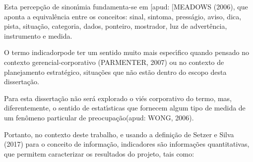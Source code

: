 \documentclass[
12pt,		%
openright,	%
twoside,  %
a4paper,			%
chapter=TITLE,		%
english,			%
french,				%
spanish,			%
brazil				%
]{USPSC-classe/USPSC}
\begin{document}
Esta percep\c{c}\~ao de sinon\'{\i}mia fundamenta-se em [apud: [MEADOWS (2006), que aponta a equival\^encia entre os conceitos: sinal, sintoma, press\'agio, aviso, dica, pista, situa\c{c}\~ao, categoria, dados, ponteiro, mostrador, luz de advert\^encia, instrumento e medida.

















O termo \textquotedbl indicador\textquotedbl  pode ter um sentido muito mais espec\'{\i}fico quando pensado no contexto gerencial-corporativo (PARMENTER, 2007) ou no contexto de planejamento estrat\'egico, situa\c{c}\~oes que n\~ao est\~ao dentro do escopo desta disserta\c{c}\~ao.

















Para esta disserta\c{c}\~ao n\~ao ser\'a explorado o vi\'es corporativo do termo, mas, diferentemente, o sentido de \textquotedbl estat\'{\i}sticas que fornecem algum tipo de medida de um fen\^omeno particular de preocupa\c{c}\~ao\textquotedbl  (apud: WONG, 2006).

















Portanto, no contexto deste trabalho, e usando a defini\c{c}\~ao de  Setzer e Silva (2017) para o conceito de \textquotedbl informa\c{c}\~ao\textquotedbl , indicadores s\~ao informa\c{c}\~oes quantitativas, que permitem caracterizar os resultados do projeto, tais como:
\end{document}
